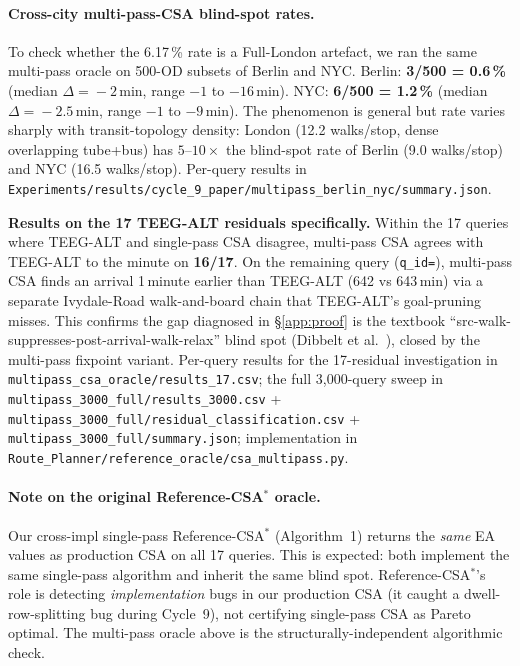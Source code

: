 \documentclass[letterpaper]{article}
\begin{document}
\paragraph{Cross-city multi-pass-CSA blind-spot rates.}
To check whether the 6.17\,\% rate is a Full-London artefact, we ran
the same multi-pass oracle on 500-OD subsets of Berlin and NYC.
Berlin: \textbf{3/500 = 0.6\,\%} (median $\Delta\!=\!-2$\,min, range
$-1$ to $-16$\,min). NYC: \textbf{6/500 = 1.2\,\%} (median
$\Delta\!=\!-2.5$\,min, range $-1$ to $-9$\,min). The phenomenon is
general but rate varies sharply with transit-topology density:
London (12.2 walks/stop, dense overlapping tube+bus) has $5\text{--}10\times$
the blind-spot rate of Berlin (9.0 walks/stop) and NYC (16.5
walks/stop). Per-query results in
\texttt{Experiments/results/cycle\_9\_paper/multipass\_berlin\_nyc/}\allowbreak\texttt{summary.json}.

\textbf{Results on the 17 TEEG-ALT residuals specifically.} Within
the 17 queries where TEEG-ALT and single-pass CSA disagree,
multi-pass CSA agrees with TEEG-ALT to the minute on \textbf{16/17}.
On the remaining query (\texttt{q\_id\!=}), multi-pass CSA
finds an arrival 1\,minute earlier than TEEG-ALT (642 vs 643\,min)
via a separate Ivydale-Road walk-and-board chain that TEEG-ALT's
goal-pruning misses. This confirms the gap diagnosed in
\S\ref{app:proof} is the textbook
``src-walk-suppresses-post-arrival-walk-relax'' blind spot
(Dibbelt et al.\ \cite{dibbelt2018csa}), closed by the multi-pass
fixpoint variant. Per-query results for the 17-residual
investigation in
\texttt{multipass\_csa\_oracle/results\_17.csv}; the full
3{,}000-query sweep in
\texttt{multipass\_3000\_full/results\_3000.csv} +
\texttt{multipass\_3000\_full/residual\_classification.csv} +
\texttt{multipass\_3000\_full/summary.json}; implementation in
\texttt{Route\_Planner/reference\_oracle/csa\_multipass.py}.

\paragraph{Note on the original Reference-CSA${}^*$ oracle.}
Our cross-impl single-pass Reference-CSA${}^*$ (Algorithm~1)
returns the \emph{same} EA values as production CSA on all 17
queries. This is expected: both implement the same single-pass
algorithm and inherit the same blind spot. Reference-CSA${}^*$'s
role is detecting \emph{implementation} bugs in our production CSA
(it caught a dwell-row-splitting bug during Cycle~9), not
certifying single-pass CSA as Pareto optimal. The multi-pass
oracle above is the structurally-independent algorithmic check.
\end{document}
